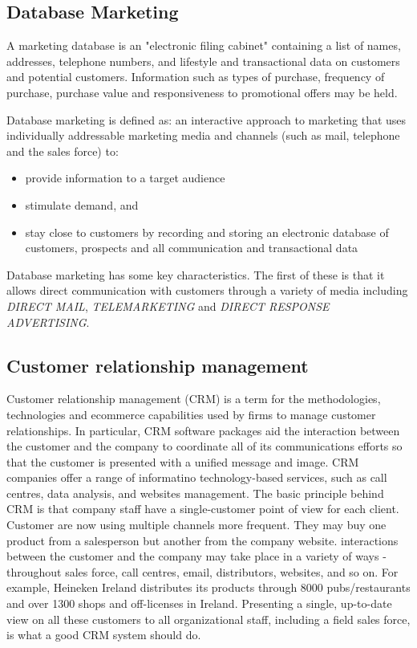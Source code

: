 \documentclass{article}
\begin{document}
\subsection{Database Marketing}
A marketing database is an "electronic filing cabinet" containing a list of names, addresses, telephone numbers, and lifestyle and transactional data on customers and potential customers. Information such as types of purchase, frequency of purchase, purchase value and responsiveness to promotional offers may be held.

Database marketing is defined as: an interactive approach to marketing that uses individually addressable marketing media and channels (such as mail, telephone and the sales force) to: 

\begin{itemize}
    \item provide information to a target audience
    \item stimulate demand, and
    \item stay close to customers by recording and storing an electronic database of customers, prospects and all communication and transactional data
\end{itemize}

Database marketing has some key characteristics. The first of these is that it allows direct communication with customers through a variety of media including \emph{DIRECT MAIL}, \emph{TELEMARKETING} and \emph{DIRECT RESPONSE ADVERTISING}.

\subsection{Customer relationship management}
Customer relationship management (CRM) is a term for the methodologies, technologies and ecommerce capabilities used by firms to manage customer relationships. In particular, CRM software packages aid the interaction between the customer and the company to coordinate all of its communications efforts so that the customer is presented with a unified message and image. CRM companies offer a range of informatino technology-based services, such as call centres, data analysis, and websites management. The basic principle behind CRM is that company staff have a single-customer point of view for each client. Customer are now using multiple channels more frequent. They may buy one product from a salesperson but another from the company website. interactions between the customer and the company may take place in a variety of ways - throughout sales force, call centres, email, distributors, websites, and so on. For example, Heineken Ireland distributes its products through 8000 pubs/restaurants and over 1300 shops and off-licenses in Ireland. Presenting a single, up-to-date view on all these customers to all organizational staff, including a field sales force, is what a good CRM system should do.
\end{document}

